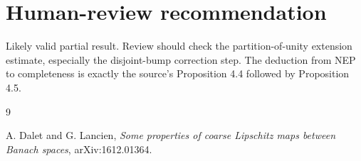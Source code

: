 \documentclass[11pt]{article}
\begin{document}
\section*{Human-review recommendation}

Likely valid partial result.  Review should check the partition-of-unity
extension estimate, especially the disjoint-bump correction step.  The
deduction from NEP to completeness is exactly the source's
Proposition 4.4 followed by Proposition 4.5.

\begin{thebibliography}{9}

A. Dalet and G. Lancien,
\emph{Some properties of coarse Lipschitz maps between Banach spaces},
arXiv:1612.01364.

\end{thebibliography}
\end{document}
